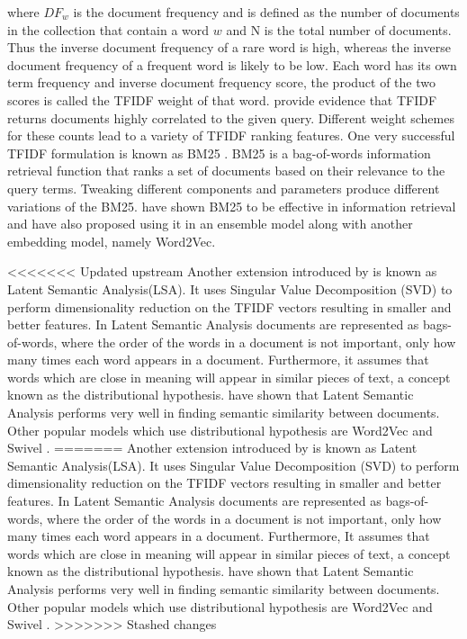 where $DF_{w}$ is the document frequency and is defined as the number of documents in the collection that contain a word $w$ and N is the total number of documents. Thus the inverse document frequency of a rare word is high, whereas the inverse document frequency of a frequent word is likely to be low. Each word has its own term frequency and inverse document frequency score, the product of the two scores is called the TFIDF weight of that word. \citet{ramos2003using} provide evidence that TFIDF returns
documents highly correlated to the given query. Different weight schemes for these counts lead to a variety of TFIDF ranking features. One very successful TFIDF
formulation is known as BM25 \citep{robertson2009probabilistic}.
BM25  is a bag-of-words information retrieval function that ranks a set of documents based on their relevance to the query terms. Tweaking different components and parameters produce different variations of the BM25. \citet{mitra2016dual} have shown BM25 to be effective in information retrieval and have also proposed using it in an ensemble model along with another embedding model, namely Word2Vec. 


<<<<<<< Updated upstream
Another extension introduced by \citet{dumais2004latent} is known as Latent Semantic Analysis(LSA). It uses Singular Value Decomposition (SVD) to perform dimensionality reduction on the TFIDF vectors resulting in smaller and better features. In Latent Semantic Analysis documents are represented as bags-of-words, where the order of the words in a document is not important, only how many times each word appears in a document. Furthermore, it assumes that words which are close in meaning will appear in similar pieces of text, a concept known as the distributional hypothesis. \citet{boling2014semantic} have shown that Latent Semantic Analysis performs very well in finding semantic similarity between documents. Other popular models which use distributional hypothesis are Word2Vec \citep{mikolov2013efficient} and Swivel \citep{shazeer2016swivel}.
=======
Another extension introduced by \citet{dumais2004latent} is known as Latent Semantic Analysis(LSA). It uses Singular Value Decomposition (SVD) to perform dimensionality reduction on the TFIDF vectors resulting in smaller and better features. In Latent Semantic Analysis documents are represented as bags-of-words, where the order of the words in a document is not important, only how many times each word appears in a document. Furthermore, It assumes that words which are close in meaning will appear in similar pieces of text, a concept known as the distributional hypothesis. \citet{boling2014semantic} have shown that Latent Semantic Analysis performs very well in finding semantic similarity between documents. Other popular models which use distributional hypothesis are Word2Vec \citep{mikolov2013efficient} and Swivel \citep{shazeer2016swivel}.
>>>>>>> Stashed changes
